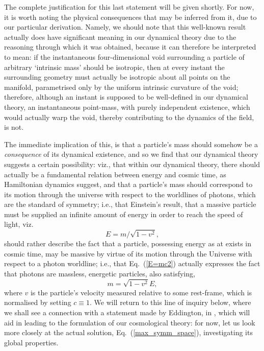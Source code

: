 The complete justification for this last statement will be given shortly. For now, it is worth noting the physical consequences that may be inferred from it, due to our particular derivation. Namely, we should note that this well-known result actually does have significant meaning in our dynamical theory due to the reasoning through which it was obtained, because it can therefore be interpreted to mean: if the instantaneous four-dimensional void surrounding a particle of arbitrary `intrinsic mass' should be isotropic, then at every instant the surrounding geometry must actually be isotropic about all points on the manifold, parametrised only by the uniform intrinsic curvature of the void; therefore, although an instant is supposed to be well-defined in our dynamical theory, an instantaneous point-mass, with purely independent existence, which would actually warp the void, thereby contributing to the dynamics of the field, is not. 

The immediate implication of this, is that a particle's mass should somehow be a \textit{consequence} of its dynamical existence, and so we find that our dynamical theory suggests a certain possibility: viz., that within our dynamical theory, there should actually be a fundamental relation between energy and cosmic time, as Hamiltonian dynamics suggest, and that a particle's mass should correspond to its motion through the universe with respect to the worldlines of photons, which are the standard of symmetry; i.e., that Einstein's result, that a massive particle must be supplied an infinite amount of energy in order to reach the speed of light, viz.
\begin{equation}
E=m/\sqrt{1-v^2},\label{E=mc2}
\end{equation}
should rather describe the fact that a particle, possessing energy as at exists in cosmic time, may be massive by virtue of its motion through the Universe with respect to a photon worldline; i.e., that Eq.~(\ref{E=mc2}) actually expresses the fact that photons are massless, energetic particles, also satisfying,
\begin{equation}
m=\sqrt{1-v^2}E,
\end{equation}
where $v$ is the particle's velocity measured relative to some rest-frame, which is normalised by setting $c\equiv1$. We will return to this line of inquiry below, where we shall see a connection with a statement made by Eddington, in \cite{Eddington1923}, which will aid in leading to the formulation of our cosmological theory: for now, let us look more closely at the actual solution, Eq.~(\ref{max_symm_space}), investigating its global properties. 

